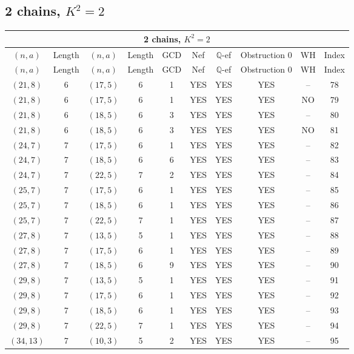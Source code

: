 \subsection{2 chains, $K^2 = 2$}
\begin{longtable}{|c|c|c|c|c|c|c|c|c|c|}
\hline
\multicolumn{10}{|c|}{2 chains, $K^2 = 2$}\\
\hline
$(n,a)$ & Length & $(n,a)$ & Length & GCD & Nef & $\mathbb Q$-ef & Obstruction 0 & WH & Index\\
\hline
\endfirsthead

\hline
$(n,a)$ & Length & $(n,a)$ & Length & GCD & Nef & $\mathbb Q$-ef & Obstruction 0 & WH & Index\\
\hline
\endhead
\hline
\endfoot

$(21, 8)$ & 6 & $(17, 5)$ & 6 & 1 & YES & YES & YES & -- & 78\\
$(21, 8)$ & 6 & $(17, 5)$ & 6 & 1 & YES & YES & YES & NO & 79\\
$(21, 8)$ & 6 & $(18, 5)$ & 6 & 3 & YES & YES & YES & -- & 80\\
$(21, 8)$ & 6 & $(18, 5)$ & 6 & 3 & YES & YES & YES & NO & 81\\
$(24, 7)$ & 7 & $(17, 5)$ & 6 & 1 & YES & YES & YES & -- & 82\\
$(24, 7)$ & 7 & $(18, 5)$ & 6 & 6 & YES & YES & YES & -- & 83\\
$(24, 7)$ & 7 & $(22, 5)$ & 7 & 2 & YES & YES & YES & -- & 84\\
$(25, 7)$ & 7 & $(17, 5)$ & 6 & 1 & YES & YES & YES & -- & 85\\
$(25, 7)$ & 7 & $(18, 5)$ & 6 & 1 & YES & YES & YES & -- & 86\\
$(25, 7)$ & 7 & $(22, 5)$ & 7 & 1 & YES & YES & YES & -- & 87\\
$(27, 8)$ & 7 & $(13, 5)$ & 5 & 1 & YES & YES & YES & -- & 88\\
$(27, 8)$ & 7 & $(17, 5)$ & 6 & 1 & YES & YES & YES & -- & 89\\
$(27, 8)$ & 7 & $(18, 5)$ & 6 & 9 & YES & YES & YES & -- & 90\\
$(29, 8)$ & 7 & $(13, 5)$ & 5 & 1 & YES & YES & YES & -- & 91\\
$(29, 8)$ & 7 & $(17, 5)$ & 6 & 1 & YES & YES & YES & -- & 92\\
$(29, 8)$ & 7 & $(18, 5)$ & 6 & 1 & YES & YES & YES & -- & 93\\
$(29, 8)$ & 7 & $(22, 5)$ & 7 & 1 & YES & YES & YES & -- & 94\\
$(34, 13)$ & 7 & $(10, 3)$ & 5 & 2 & YES & YES & YES & -- & 95\\

\end{longtable}
